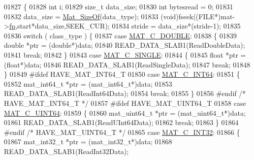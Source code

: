 \begin{DoxyCode}
{{{{{{{{{01827 \{
01828     \textcolor{keywordtype}{int} i;
01829     \textcolor{keywordtype}{size\_t} data\_size;
01830     \textcolor{keywordtype}{int}    bytesread = 0;
01831 
01832     data\_size = \hyperlink{group__mat__util_gab6774aabdc124c540c1e7686d0804940}{Mat\_SizeOf}(data\_type);
01833     (void)fseek((FILE*)mat->\hyperlink{struct__mat__t_a85f562e407ca9ad4d2a6e14f839432b7}{fp},start*data\_size,SEEK\_CUR);
01834     stride = data\_size*(stride-1);
01835 
01836     \textcolor{keywordflow}{switch} ( class\_type ) \{
01837         \textcolor{keywordflow}{case} \hyperlink{group___m_a_t_ggad4d60ae7b709fc81bfd744fb4c857c40a5d70e0862e5bdb7bd86bf7ba5948f307}{MAT\_C\_DOUBLE}:
01838         \{
01839             \textcolor{keywordtype}{double} *ptr = (\textcolor{keywordtype}{double}*)data;
01840             READ\_DATA\_SLAB1(ReadDoubleData);
01841             \textcolor{keywordflow}{break};
01842         \}
01843         \textcolor{keywordflow}{case} \hyperlink{group___m_a_t_ggad4d60ae7b709fc81bfd744fb4c857c40a2825631e26a961cbe0f79db50a39cea2}{MAT\_C\_SINGLE}:
01844         \{
01845             \textcolor{keywordtype}{float} *ptr = (\textcolor{keywordtype}{float}*)data;
01846             READ\_DATA\_SLAB1(ReadSingleData);
01847             \textcolor{keywordflow}{break};
01848         \}
01849 \textcolor{preprocessor}{#ifdef HAVE\_MAT\_INT64\_T}
01850         \textcolor{keywordflow}{case} \hyperlink{group___m_a_t_ggad4d60ae7b709fc81bfd744fb4c857c40a1ea83bcde49b35477494412973f82409}{MAT\_C\_INT64}:
01851         \{
01852             mat\_int64\_t *ptr = (mat\_int64\_t*)data;
01853             READ\_DATA\_SLAB1(ReadInt64Data);
01854             \textcolor{keywordflow}{break};
01855         \}
01856 \textcolor{preprocessor}{#endif }\textcolor{comment}{/* HAVE\_MAT\_INT64\_T */}\textcolor{preprocessor}{}
01857 \textcolor{preprocessor}{#ifdef HAVE\_MAT\_UINT64\_T}
01858         \textcolor{keywordflow}{case} \hyperlink{group___m_a_t_ggad4d60ae7b709fc81bfd744fb4c857c40a86470e25c3763d9a24623f04326195dd}{MAT\_C\_UINT64}:
01859         \{
01860             mat\_uint64\_t *ptr = (mat\_uint64\_t*)data;
01861             READ\_DATA\_SLAB1(ReadUInt64Data);
01862             \textcolor{keywordflow}{break};
01863         \}
01864 \textcolor{preprocessor}{#endif }\textcolor{comment}{/* HAVE\_MAT\_UINT64\_T */}\textcolor{preprocessor}{}
01865         \textcolor{keywordflow}{case} \hyperlink{group___m_a_t_ggad4d60ae7b709fc81bfd744fb4c857c40adb44fc39694e3152ae5e69470a2fefe8}{MAT\_C\_INT32}:
01866         \{
01867             mat\_int32\_t *ptr = (mat\_int32\_t*)data;
01868             READ\_DATA\_SLAB1(ReadInt32Data);
}}}}}}}}}
\end{DoxyCode}
